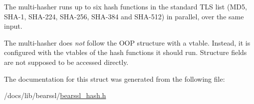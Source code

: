 The multi-\/hasher runs up to six hash functions in the standard T\+LS list (M\+D5, S\+H\+A-\/1, S\+H\+A-\/224, S\+H\+A-\/256, S\+H\+A-\/384 and S\+H\+A-\/512) in parallel, over the same input.

The multi-\/hasher does {\itshape not} follow the O\+OP structure with a vtable. Instead, it is configured with the vtables of the hash functions it should run. Structure fields are not supposed to be accessed directly. 

The documentation for this struct was generated from the following file\+:\begin{DoxyCompactItemize}
\item 
/docs/lib/bearssl/\hyperlink{bearssl__hash_8h}{bearssl\+\_\+hash.\+h}\end{DoxyCompactItemize}
